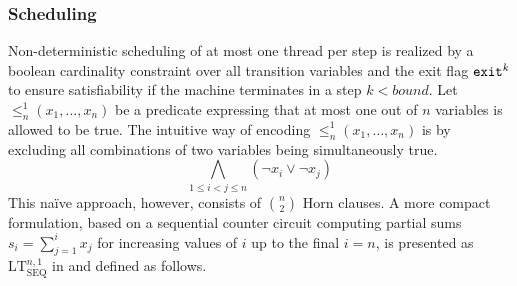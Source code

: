 \subsubsection{Scheduling}

\newcommand{\CardLt}{\leq^1_n(x_1, \ldots, x_n)}
\newcommand{\CardLtSeq}{\text{LT}^{n, 1}_{\text{SEQ}}}

\newcommand{\ITE}{\texttt{ite}}
\newcommand{\ITEindent}{\;\;\;\;\;\;\;}

Non-deterministic scheduling of at most one thread per step is realized by a boolean cardinality constraint over all transition variables and the exit flag $\texttt{exit}^k$ to ensure satisfiability if the machine terminates in a step $k < bound$.
Let $\CardLt$ be a predicate expressing that at most one out of $n$ variables is allowed to be true.
The intuitive way of encoding $\CardLt$ is by excluding all combinations of two variables being simultaneously true.
\[
  \bigwedge_{1 \leq i < j \leq n} (\neg x_i \lor \neg x_j)
\]
This na\"ive approach, however, consists of $\binom{n}{2}$ Horn clauses.
A more compact formulation, based on a sequential counter circuit computing partial sums $s_i = \sum^i_{j = 1} x_j$ for increasing values of $i$ up to the final $i = n$, is presented as $\CardLtSeq$ in \cite{ref:Sinz} and defined as follows.
